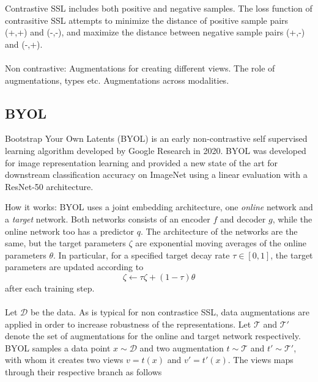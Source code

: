 \documentclass[../../thesis.tex]{subfiles}
\begin{document}
Contrastive SSL includes both positive and negative samples. The loss function of contrasitive SSL attempts to minimize the distance of positive sample pairs (+,+) and (-,-), and maximize the distance between negative sample pairs (+,-) and (-,+).\\\\

Non contrastive:
Augmentations for creating different views. The role of augmentations, types etc. Augmentations across modalities. 



\subsection{BYOL}
\cite{grill2020bootstrap}
Bootstrap Your Own Latents (BYOL) is an early non-contrastive self supervised learning algorithm developed by Google Research in 2020. BYOL was developed for image representation learning and provided a new state of the art for downstream classification accuracy on ImageNet using a linear evaluation with a ResNet-50 architecture. 

How it works:
BYOL uses a joint embedding architecture, one \textit{online} network and a \textit{target} network. Both networks consists of an encoder $f$ and decoder $g$, while the online network too has a predictor $q$. The architecture of the networks are the same, but the target parameters $\zeta$ are exponential moving averages of the online parameters $\theta$. In particular, for a specified target decay rate $\tau\in[0,1]$, the target parameters are updated according to 
\begin{equation}
    \zeta \leftarrow \tau \zeta + (1-\tau)\theta
\end{equation}
after each training step. \\\\

Let $\mathcal{D}$ be the data. As is typical for non contrastice SSL, data augmentations are applied in order to increase robustness of the representations. Let $\mathcal{T}$  and $\mathcal{T'}$ denote the set of augmentations for the online and target network respectively. BYOL samples a data point $x\sim \mathcal{D}$ and two augmentation $t\sim \mathcal{T}$ and $t'\sim \mathcal{T'}$, with whom it creates two views $v = t(x)$ and $v' = t'(x)$. The views maps through their respective branch as follows
\end{document}
